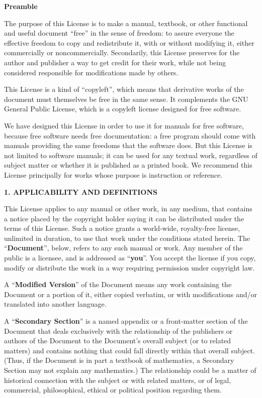 \documentclass[11pt]{book}
\numberwithin{example}{chapter}
\begin{document}
\begin{center}
{\bf\large Preamble}
\end{center}

The purpose of this License is to make a manual, textbook, or other
functional and useful document ``free'' in the sense of freedom: to
assure everyone the effective freedom to copy and redistribute it,
with or without modifying it, either commercially or noncommercially.
Secondarily, this License preserves for the author and publisher a way
to get credit for their work, while not being considered responsible
for modifications made by others.

This License is a kind of ``copyleft'', which means that derivative
works of the document must themselves be free in the same sense.  It
complements the GNU General Public License, which is a copyleft
license designed for free software.

We have designed this License in order to use it for manuals for free
software, because free software needs free documentation: a free
program should come with manuals providing the same freedoms that the
software does.  But this License is not limited to software manuals;
it can be used for any textual work, regardless of subject matter or
whether it is published as a printed book.  We recommend this License
principally for works whose purpose is instruction or reference.


\begin{center}
{\Large\bf 1. APPLICABILITY AND DEFINITIONS\par}
\end{center}

This License applies to any manual or other work, in any medium, that
contains a notice placed by the copyright holder saying it can be
distributed under the terms of this License.  Such a notice grants a
world-wide, royalty-free license, unlimited in duration, to use that
work under the conditions stated herein.  The ``\textbf{Document}'', below,
refers to any such manual or work.  Any member of the public is a
licensee, and is addressed as ``\textbf{you}''.  You accept the license if you
copy, modify or distribute the work in a way requiring permission
under copyright law.

A ``\textbf{Modified Version}'' of the Document means any work containing the
Document or a portion of it, either copied verbatim, or with
modifications and/or translated into another language.

A ``\textbf{Secondary Section}'' is a named appendix or a front-matter section of
the Document that deals exclusively with the relationship of the
publishers or authors of the Document to the Document's overall subject
(or to related matters) and contains nothing that could fall directly
within that overall subject.  (Thus, if the Document is in part a
textbook of mathematics, a Secondary Section may not explain any
mathematics.)  The relationship could be a matter of historical
connection with the subject or with related matters, or of legal,
commercial, philosophical, ethical or political position regarding
them.
\end{document}
